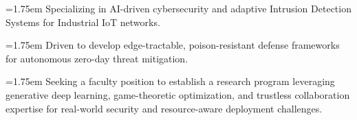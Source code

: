 
\noindent\hangindent=1.75em\makebox[1.5em][l]{\textcolor{MarkerColour}{\faAngleRight}} Specializing in AI-driven cybersecurity and adaptive Intrusion Detection Systems for Industrial IoT networks.

\noindent\hangindent=1.75em\makebox[1.5em][l]{\textcolor{MarkerColour}{\faAngleRight}} Driven to develop edge-tractable, poison-resistant defense frameworks for autonomous zero-day threat mitigation.


\noindent\hangindent=1.75em\makebox[1.5em][l]{\textcolor{MarkerColour}{\faAngleRight}} Seeking a faculty position to establish a research program leveraging generative deep learning, game-theoretic optimization, and trustless collaboration expertise for real-world security and resource-aware deployment challenges.
